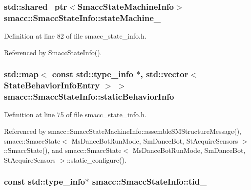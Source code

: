 \subsubsection[{\texorpdfstring{state\+Machine\+\_\+}{stateMachine_}}]{\setlength{\rightskip}{0pt plus 5cm}std\+::shared\+\_\+ptr$<${\bf Smacc\+State\+Machine\+Info}$>$ smacc\+::\+Smacc\+State\+Info\+::state\+Machine\+\_\+}\hypertarget{classsmacc_1_1SmaccStateInfo_af9884b3fda41fbc87abf9908b8bd72e7}{}\label{classsmacc_1_1SmaccStateInfo_af9884b3fda41fbc87abf9908b8bd72e7}


Definition at line 82 of file smacc\+\_\+state\+\_\+info.\+h.



Referenced by Smacc\+State\+Info().

\subsubsection[{\texorpdfstring{static\+Behavior\+Info}{staticBehaviorInfo}}]{\setlength{\rightskip}{0pt plus 5cm}std\+::map$<$ const std\+::type\+\_\+info $\ast$, std\+::vector$<$ {\bf State\+Behavior\+Info\+Entry} $>$ $>$ smacc\+::\+Smacc\+State\+Info\+::static\+Behavior\+Info\hspace{0.3cm}{\ttfamily [static]}}\hypertarget{classsmacc_1_1SmaccStateInfo_a2cc62c6c9dec1a4f5294f8430efb71f2}{}\label{classsmacc_1_1SmaccStateInfo_a2cc62c6c9dec1a4f5294f8430efb71f2}


Definition at line 75 of file smacc\+\_\+state\+\_\+info.\+h.



Referenced by smacc\+::\+Smacc\+State\+Machine\+Info\+::assemble\+S\+M\+Structure\+Message(), smacc\+::\+Smacc\+State$<$ Ms\+Dance\+Bot\+Run\+Mode, Sm\+Dance\+Bot, St\+Acquire\+Sensors $>$\+::\+Smacc\+State(), and smacc\+::\+Smacc\+State$<$ Ms\+Dance\+Bot\+Run\+Mode, Sm\+Dance\+Bot, St\+Acquire\+Sensors $>$\+::static\+\_\+configure().

\subsubsection[{\texorpdfstring{tid\+\_\+}{tid_}}]{\setlength{\rightskip}{0pt plus 5cm}const std\+::type\+\_\+info$\ast$ smacc\+::\+Smacc\+State\+Info\+::tid\+\_\+}\hypertarget{classsmacc_1_1SmaccStateInfo_adaed55d2f9b823cd2ff0df04aaab1d1c}{}\label{classsmacc_1_1SmaccStateInfo_adaed55d2f9b823cd2ff0df04aaab1d1c}


